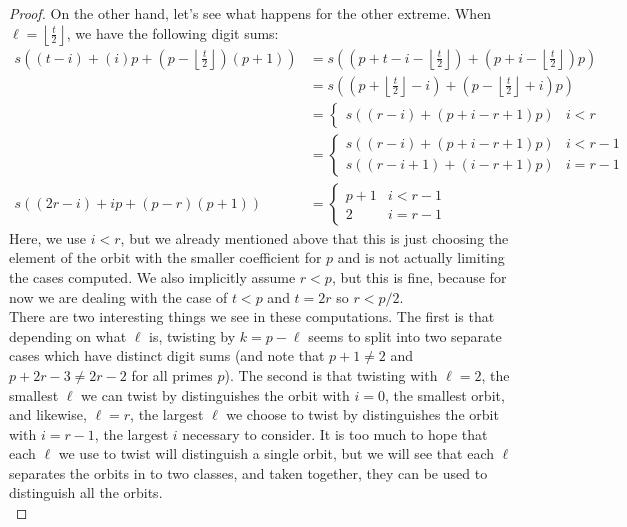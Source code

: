 \documentclass[12pt]{article}
\theoremstyle{customtheorem}%
\theoremstyle{remark}
\theoremstyle{definition}
\numberwithin{equation}{section}
\numberwithin{theorem}{section}
\begin{document}
\begin{proof}
On the other hand, let's see what happens for the other extreme. When $\ell = \left\lfloor \frac{t}{2} \right\rfloor$, we have the following digit sums:
\begin{align*}
 s\left((t-i) + (i)p + \left(p - \left\lfloor \frac{t}{2} \right\rfloor\right)(p+1)\right) &= s\left(\left(p + t- i - \left\lfloor \frac{t}{2} \right\rfloor\right) + \left(p + i -\left\lfloor \frac{t}{2} \right\rfloor\right)p\right) \\ 
 &=s\left(\left(p + \left\lfloor \frac{t}{2} \right\rfloor - i\right) + \left(p -\left\lfloor \frac{t}{2} \right\rfloor + i\right)p\right) \\
 &= \begin{cases}
s((r-i) + (p+i-r+1)p) & i < r
 \end{cases} \\
 &= \begin{cases}
s((r-i) + (p+i-r+1)p) & i < r-1 \\
 s((r-i+1) + (i-r+1)p) & i = r-1
 \end{cases} \\
  s((2r-i) + ip + (p - r)(p+1)) &= \begin{cases}
p+1 & i < r-1 \\
2 & i = r-1
 \end{cases}
\end{align*}
Here, we use $i < r$, but we already mentioned above that this is just choosing the element of the orbit with the smaller coefficient for $p$ and is not actually limiting the cases computed. We also implicitly assume $r < p$, but this is fine, because for now we are dealing with the case of $t < p$ and $t = 2r$ so $ r < p/2$.
\\

There are two interesting things we see in these computations. The first is that depending on what $\ell$ is, twisting by $k = p - \ell$ seems to split into two separate cases which have distinct digit sums (and note that $p+1 \neq 2$ and $p+2r-3 \neq 2r-2$ for all primes $p$). The second is that twisting with $\ell = 2$, the smallest $\ell$ we can twist by distinguishes the orbit with $i = 0$, the smallest orbit, and likewise, $\ell = r$, the largest $\ell$ we choose to twist by distinguishes the orbit with $i = r-1$, the largest $i$ necessary to consider. It is too much to hope that each $\ell$ we use to twist will distinguish a single orbit, but we will see that each $\ell$ separates the orbits in to two classes, and taken together, they can be used to distinguish all the orbits.
\\


\end{proof}
\end{document}
